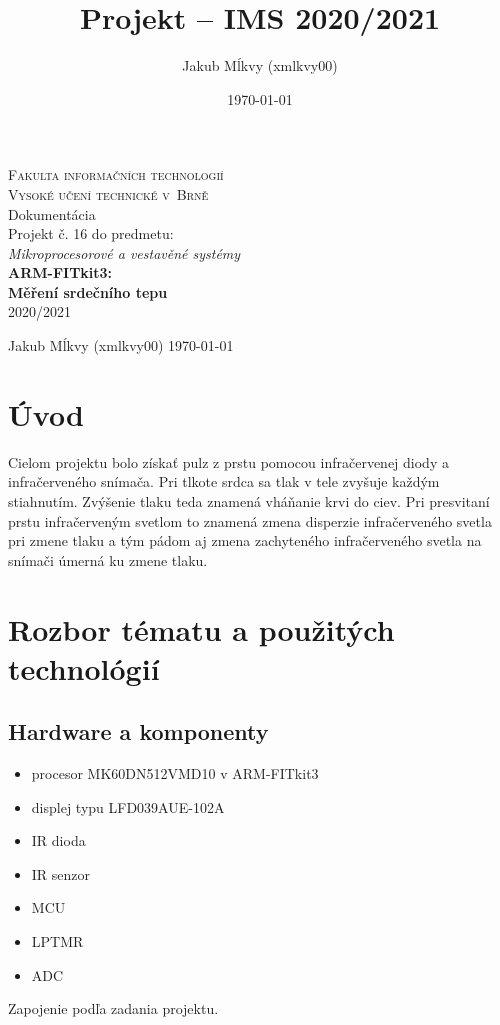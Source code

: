 \documentclass[a4paper,12pt]{article}
\author{Jakub Mĺkvy (xmlkvy00)}
\date{\today}
\title{\Large\bf Projekt -- IMS 2020/2021}
\begin{document}
\begin{titlepage}
	\begin{center}
	    \vspace*{+3cm}
		\Huge
		\textsc{Fakulta informačních technologií\\
		\huge Vysoké učení technické v~Brně}\\
	    {\LARGE{Dokumentácia\\Projekt č. 16 do predmetu:\\ \textit{Mikroprocesorové a vestavěné systémy}\\
		 \vspace{4mm}
		 \Huge\textbf{{ARM-FITkit3: \\ Měření srdečního tepu}}\\
		 \vspace{4mm}
		 2020/2021
		 }}
		 
	\end{center}
	{\Large Jakub Mĺkvy (xmlkvy00) \hfill
	\today}
	
	\thispagestyle{empty}
    \setcounter{page}{0}
\end{titlepage}

\newpage

\tableofcontents

\newpage
\section{Úvod}

\quad Cielom projektu bolo získať pulz z prstu pomocou infračervenej diody a infračerveného snímača. Pri tlkote srdca sa tlak v tele zvyšuje každým stiahnutím. Zvýšenie tlaku teda znamená vháňanie krvi do ciev. Pri presvitaní prstu infračerveným svetlom to znamená zmena disperzie infračerveného svetla pri zmene tlaku a tým pádom aj zmena zachyteného infračerveného svetla na snímači úmerná ku zmene tlaku.

\section{Rozbor tématu a použitých technológií}

\subsection{Hardware a komponenty}
\begin{itemize}
    \item procesor MK60DN512VMD10 v ARM-FITkit3
    \item displej typu LFD039AUE-102A
    \item IR dioda
    \item IR senzor
    \item MCU
    \item LPTMR
    \item ADC
\end{itemize}
Zapojenie podľa zadania projektu. \cite{projekt}
\end{document}
